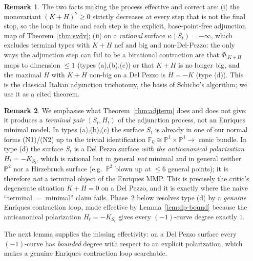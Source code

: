 \documentclass{amsart}
\theoremstyle{plain}
\theoremstyle{definition}
\newtheorem{remark}{Remark}
\newcommand{\PP}{\mathbb{P}}
\begin{document}
\begin{remark}\label{rem:adjvalid}
The two facts making the process effective and correct are: (i) the monovariant
$(K+H)^2\ge0$ strictly decreases at every step that is not the final stop, so the
loop is finite and each step is the explicit, base-point-free adjunction map of
Theorem~\ref{thm:svdv}; (ii) on a \emph{rational} surface $\kappa(S_t)=-\infty$,
which excludes terminal types with $K+H$ nef and big and non-Del-Pezzo: the only
ways the adjunction step can fail to be a birational contraction are that
$\Phi_{|K+H|}$ maps to dimension $\le1$ (types (a),(b),(c)) or that $K+H$ is no
longer big, and the maximal $H$ with $K+H$ non-big on a Del Pezzo is $H=-K$
(type (d)).  This is the classical Italian adjunction trichotomy, the basis of
Schicho's algorithm; we use it as a cited theorem.
\end{remark}

\begin{remark}\label{rem:nomin}
We emphasise what Theorem~\ref{thm:adjterm} does and does not give: it produces a
\emph{terminal pair} $(S_t,H_t)$ of the adjunction process, not an Enriques
minimal model.  In types (a),(b),(c) the surface $S_t$ is already in one of our
normal forms (N1)/(N2) up to the trivial identification $\mathbb F_0\cong
\PP^1\times\PP^1\to$ conic bundle.  In type (d) the surface $S_t$ is a Del Pezzo
surface \emph{with the anticanonical polarization $H_t=-K_{S_t}$}, which is
rational but in general \emph{not} minimal and in general neither $\PP^2$ nor a
Hirzebruch surface (e.g.\ $\PP^2$ blown up at $\le6$ general points); it is
therefore \emph{not} a terminal object of the Enriques MMP.  This is precisely
the critic's degenerate situation $K+H=0$ on a Del Pezzo, and it is exactly where
the naive ``terminal $=$ minimal'' claim fails.  Phase~2 below resolves type (d)
by a \emph{genuine} Enriques contraction loop, made effective by
Lemma~\ref{lem:dp-bound} because the anticanonical polarization $H_t=-K_{S_t}$
gives every $(-1)$-curve degree exactly $1$.
\end{remark}

The next lemma supplies the missing effectivity: on a Del Pezzo surface every
$(-1)$-curve has \emph{bounded} degree with respect to an explicit polarization,
which makes a genuine Enriques contraction loop searchable.
\end{document}
